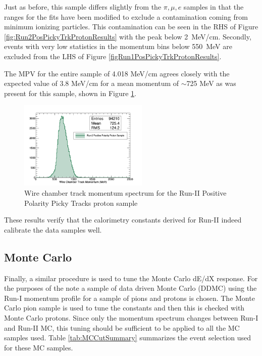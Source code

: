 Just as before, this sample differs slightly from the $\pi, \mu, e$ samples in that the ranges for the fits have been modified to exclude a contamination coming from minimum ionizing particles. This contamination can be seen in the RHS of Figure \ref{fig:Run2PosPickyTrkProtonResults} with the peak below 2~MeV/cm. Secondly, events with very low statistics in the momentum bins below 550~MeV are excluded from the LHS of Figure \ref{figRun1PosPickyTrkProtonResults}.

The MPV for the entire sample of 4.018 MeV/cm agrees closely with the expected value of 3.8 MeV/cm for a mean momentum of $\sim$725  MeV as was present for this sample, shown in Figure \ref{fig:Run1PosPickyTrkProtonMomentumSpec}.

\begin{figure}[htb]
\centering
\includegraphics[width=0.55\textwidth]{images/WCTrkMomentumRun2PosProton.png}
\caption{Wire chamber track momentum spectrum for the Run-II Positive Polarity Picky Tracks proton sample  }
\label{fig:Run1PosPickyTrkProtonMomentumSpec}
\end{figure}

These results verify that the calorimetry constants derived for Run-II indeed calibrate the data samples well.

\clearpage

\subsection{Monte Carlo}\label{sec:MCResults}

Finally, a similar procedure is used to tune the Monte Carlo dE/dX response. For the purposes of the note a sample of data driven Monte Carlo (DDMC) using the Run-I momentum profile  for a sample of pions and protons is chosen. The Monte Carlo pion sample is used to tune the constants and then this is checked with Monte Carlo protons. Since only the momentum spectrum changes between Run-I and Run-II MC, this tuning should be sufficient to be applied to all the MC samples used. Table \ref{tab:MCCutSummary} summarizes the event selection used for these MC samples.

